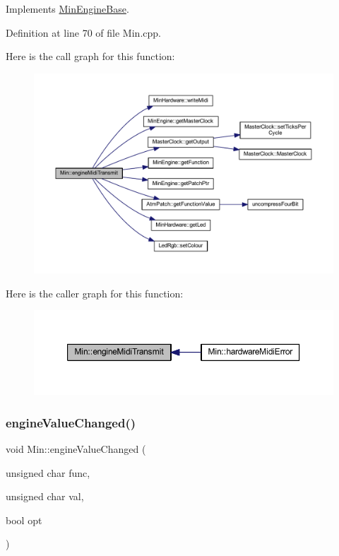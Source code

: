 Implements \hyperlink{class_min_engine_base_aaed6930bcc32b2cccf9479fb73d043d9}{Min\+Engine\+Base}.



Definition at line 70 of file Min.\+cpp.

Here is the call graph for this function\+:
\nopagebreak
\begin{figure}[H]
\begin{center}
\leavevmode
\includegraphics[width=350pt]{dd/d34/class_min_a4b150119664bd46bd2a80561862ff666_cgraph}
\end{center}
\end{figure}
Here is the caller graph for this function\+:
\nopagebreak
\begin{figure}[H]
\begin{center}
\leavevmode
\includegraphics[width=350pt]{dd/d34/class_min_a4b150119664bd46bd2a80561862ff666_icgraph}
\end{center}
\end{figure}
\mbox{\label{class_min_a9fe42a8d40c06d73556cf6d0dac2dc71}} 
\subsubsection{\texorpdfstring{engine\+Value\+Changed()}{engineValueChanged()}}
{\footnotesize\ttfamily void Min\+::engine\+Value\+Changed (\begin{DoxyParamCaption}\item[{unsigned char}]{func,  }\item[{unsigned char}]{val,  }\item[{bool}]{opt }\end{DoxyParamCaption})\hspace{0.3cm}{\ttfamily [virtual]}}



